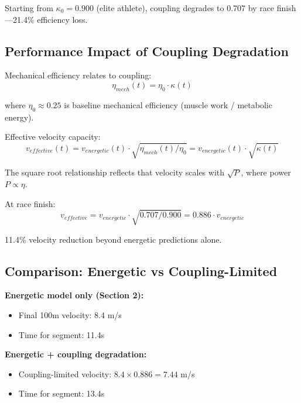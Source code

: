 Starting from $\kappa_0 = 0.900$ (elite athlete), coupling degrades to 0.707 by race finish—21.4\% efficiency loss.

\subsection{Performance Impact of Coupling Degradation}

Mechanical efficiency relates to coupling:
\begin{equation}
\eta_{mech}(t) = \eta_0 \cdot \kappa(t)
\end{equation}

where $\eta_0 \approx 0.25$ is baseline mechanical efficiency (muscle work / metabolic energy).

Effective velocity capacity:
\begin{equation}
v_{effective}(t) = v_{energetic}(t) \cdot \sqrt{\eta_{mech}(t) / \eta_0} = v_{energetic}(t) \cdot \sqrt{\kappa(t)}
\end{equation}

The square root relationship reflects that velocity scales with $\sqrt{P}$, where power $P \propto \eta$.

At race finish:
\begin{equation}
v_{effective} = v_{energetic} \cdot \sqrt{0.707/0.900} = 0.886 \cdot v_{energetic}
\end{equation}

11.4\% velocity reduction beyond energetic predictions alone.

\subsection{Comparison: Energetic vs Coupling-Limited}

\textbf{Energetic model only (Section 2):}
\begin{itemize}
    \item Final 100m velocity: 8.4 m/s
    \item Time for segment: 11.4s
\end{itemize}

\textbf{Energetic + coupling degradation:}
\begin{itemize}
    \item Coupling-limited velocity: $8.4 \times 0.886 = 7.44$ m/s
    \item Time for segment: 13.4s
\end{itemize}

